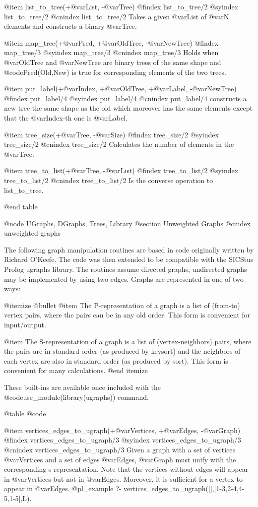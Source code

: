 @item list_to_tree(+@var{List}, -@var{Tree})
@findex list_to_tree/2
@syindex list_to_tree/2
@cnindex list_to_tree/2
Takes a given @var{List} of @var{N} elements and constructs a binary
@var{Tree}.

@item map_tree(+@var{Pred}, +@var{OldTree}, -@var{NewTree})
@findex map_tree/3
@syindex map_tree/3
@cnindex map_tree/3
Holds when @var{OldTree} and @var{NewTree} are binary trees of the same shape
and @code{Pred(Old,New)} is true for corresponding elements of the two trees.

@item put_label(+@var{Index}, +@var{OldTree}, +@var{Label}, -@var{NewTree})
@findex put_label/4
@syindex put_label/4
@cnindex put_label/4
constructs a new tree the same shape as the old which moreover has the
same elements except that the @var{Index}-th one is @var{Label}.

@item tree_size(+@var{Tree}, -@var{Size})
@findex tree_size/2
@syindex tree_size/2
@cnindex tree_size/2
Calculates the number of elements in the @var{Tree}.

@item tree_to_list(+@var{Tree}, -@var{List})
@findex tree_to_list/2
@syindex tree_to_list/2
@cnindex tree_to_list/2
Is the converse operation to list_to_tree.

@end table

@node UGraphs, DGraphs, Trees, Library
@section Unweighted Graphs
@cindex unweighted graphs

The following graph manipulation routines are based in code originally
written by Richard O'Keefe. The code was then extended to be compatible
with the SICStus Prolog ugraphs library. The routines assume directed
graphs, undirected graphs may be implemented by using two edges. Graphs
are represented in one of two ways:

@itemize @bullet
@item The P-representation of a graph is a list of (from-to) vertex
pairs, where the pairs can be in any old order.  This form is
convenient for input/output.
 
@item The S-representation of a graph is a list of (vertex-neighbors)
pairs, where the pairs are in standard order (as produced by keysort)
and the neighbors of each vertex are also in standard order (as
produced by sort).  This form is convenient for many calculations.
@end itemize

These built-ins are available once included with the
@code{use_module(library(ugraphs))} command.

@table @code

@item vertices_edges_to_ugraph(+@var{Vertices}, +@var{Edges}, -@var{Graph})
@findex  vertices_edges_to_ugraph/3
@syindex vertices_edges_to_ugraph/3
@cnindex vertices_edges_to_ugraph/3
Given a graph with a set of vertices @var{Vertices} and a set of edges
@var{Edges}, @var{Graph} must unify with the corresponding
s-representation. Note that the vertices without edges will appear in
@var{Vertices} but not in @var{Edges}. Moreover, it is sufficient for a
vertex to appear in @var{Edges}.
@pl_example
?- vertices_edges_to_ugraph([],[1-3,2-4,4-5,1-5],L).

